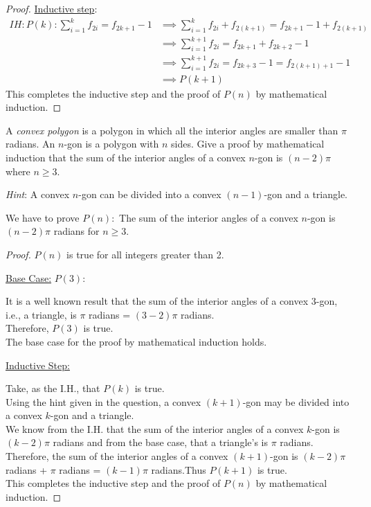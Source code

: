 \documentclass[a4paper]{exam}
\begin{document}
\begin{questions}
\begin{parts}
\begin{solution}
\begin{proof}
      \underline{Inductive step}:\\
      \begin{align*}
        IH: P(k): \sum_{i=1}^k f_{2i} = f_{2k+1} - 1 &\implies \sum_{i=1}^k f_{2i}  +f_{2(k+1)}= f_{2k+1} - 1 +f_{2(k+1)}\\
                                                     &\implies \sum_{i=1}^{k+1} f_{2i} = f_{2k+1} +f_{2k+2} - 1\\
                                                     &\implies \sum_{i=1}^{k+1} f_{2i}= f_{2k+3} - 1 = f_{2(k+1)+1} - 1\\
                                                     &\implies P(k+1)
      \end{align*}
      This completes the inductive step and the proof of $P(n)$ by mathematical induction.
      \end{proof}
    \end{solution}
  \end{parts}

\question A \textit{convex polygon} is a polygon in which all the interior angles are smaller than $\pi$ radians. An $n$-gon is a polygon with $n$ sides. Give a proof by mathematical induction that the sum of the interior angles of a convex $n$-gon is $(n-2)\pi$ where $n\ge 3$. 

  \textit{Hint}: A convex $n$-gon can be divided into a convex $(n-1)$-gon and a triangle.
  \begin{solution}
 We have to prove $P(n) :$ The sum of the interior angles of a convex $n$-gon is $(n-2)\pi$ radians for $n \geq 3$.

 \begin{proof} $P(n)$ is true for all integers greater than 2.

\underline{Base Case:} $P(3)$:

It is a well known result that the sum of the interior angles of a convex $3$-gon, i.e., a triangle, is $\pi$ radians = $(3-2)\pi$ radians. \\
Therefore, $P(3)$ is true.\\
The base case for the proof by mathematical induction holds.

\underline{Inductive Step:}

Take, as the I.H., that $P(k)$ is true. \\
Using the hint given in the question, a convex $(k+1)$-gon may be divided into a convex $k$-gon and a triangle.\\
We know from the I.H. that the sum of the interior angles of a convex $k$-gon is $(k-2)\pi$ radians and from the base case, that a triangle's is $\pi$ radians. \\
Therefore, the sum of the interior angles of a convex $(k+1)$-gon is $(k-2)\pi$ radians + $\pi$ radians = $(k-1)\pi$ radians.Thus $P(k+1)$ is true.\\
This completes the inductive step and the proof of $P(n)$ by mathematical induction.
\end{proof}
\end{solution}
  

\end{questions}
\end{document}
